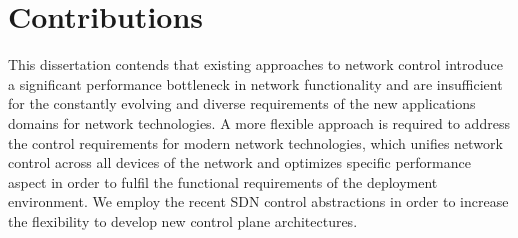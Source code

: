 




\section{Contributions} \label{sec:intro:contributions}

This dissertation contends that existing approaches to network control introduce
a significant performance bottleneck in network functionality and are
insufficient for the constantly evolving and diverse requirements of the new
applications domains for network technologies. A more flexible approach is
required to address the control requirements for modern network technologies,
which unifies network control across all devices of the network and optimizes
specific performance aspect in order to fulfil the functional requirements of
the deployment environment. We employ the recent SDN control abstractions in
order to increase the flexibility to develop new control plane architectures. 

